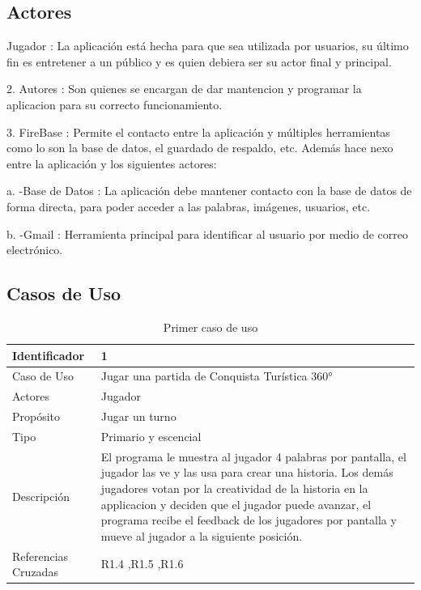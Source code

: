 \subsection{Actores}
Jugador : La aplicación está hecha para que sea utilizada por usuarios, su último fin es entretener a un público y es quien debiera ser su actor final y principal.

2. Autores : Son quienes se encargan de dar mantencion y programar la aplicacion para su correcto funcionamiento.

3. FireBase : Permite el contacto entre la aplicación y múltiples herramientas como lo son la base de datos, el guardado de respaldo, etc. Además hace nexo entre la aplicación y los siguientes actores:

a. -Base de Datos : La aplicación debe mantener contacto con la base de datos de forma directa, para poder acceder a las palabras, imágenes, usuarios, etc.

b. -Gmail : Herramienta principal para identificar al usuario por medio de correo electrónico.
\subsection{Casos de Uso}
\begin{table}[H]
    \begin{center}
        \begin{tabular}{| l | m{12cm} |}        
        	\hline 
        	Identificador & 1\\
        	\hline
        	Caso de Uso & Jugar una partida de Conquista Turística
360°\\
        	\hline
        	Actores & Jugador\\
        	\hline
        	Propósito & Jugar un turno\\
        	\hline
        	Tipo & Primario y escencial\\
        	\hline
        	Descripción & El programa le muestra al jugador 4 palabras por pantalla, el jugador las ve y las usa para crear una historia. Los demás jugadores votan por la creatividad de la historia en la applicacion y deciden que el jugador puede avanzar, el programa recibe el feedback de los jugadores por pantalla y mueve al jugador a la siguiente posición.\\
        	\hline
        	Referencias Cruzadas & R1.4 ,R1.5 ,R1.6\\
        	\hline
        \end{tabular}
    \caption{Primer caso de uso}
    \end{center}
\end{table}

